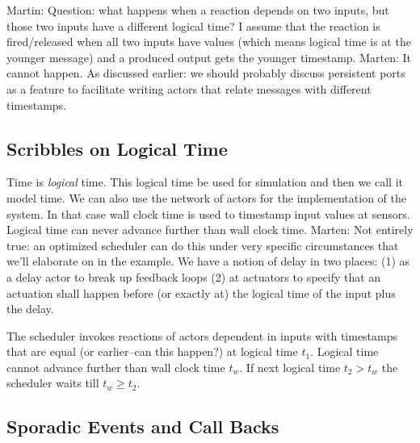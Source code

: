 \documentclass[sigconf]{acmart}
\newcommand{\martin}[1]{{\color{blue} Martin: #1}}
\newcommand{\marten}[1]{{\color{cyan} Marten: #1}}
\begin{document}

\martin{Question: what happens when a reaction depends on two inputs, but
those two inputs have a different logical time?
I assume that the reaction is fired/released when all two inputs have values
(which means logical time is at the younger message)
and a produced output gets the younger timestamp.}
\marten{It cannot happen. As discussed earlier: we should probably discuss persistent ports as a feature to facilitate writing actors that relate messages with different timestamps.}


\subsection{Scribbles on Logical Time}
Time is \emph{logical} time. This logical time be used for simulation and then
we call it model time. We can also use the network of actors for the implementation
of the system. In that case wall clock time is used to timestamp input values
at sensors. Logical time can never advance further than wall clock time. \marten{Not entirely true: an optimized scheduler can do this under very specific circumstances that we'll elaborate on in the example.}
We have a notion of delay in two places: (1) as a delay actor to break up
feedback loops (2) at actuators to specify that an actuation shall happen before
(or exactly at) the logical time of the input plus the delay.

The scheduler invokes reactions of actors dependent in inputs with timestamps
that are equal (or earlier--can this happen?) at logical time $t_1$.
Logical time cannot advance further than wall clock time $t_w$. If next logical
time $t_2 > t_w$ the scheduler waits till $t_w \ge t_2$.

\subsection{Sporadic Events and Call Backs}
\end{document}
